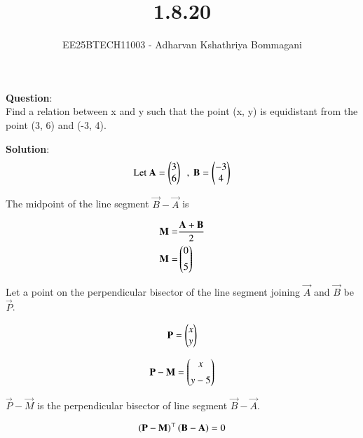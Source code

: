 \documentclass[journal]{IEEEtran}
\begin{document}

\vspace{3cm}

\title{1.8.20}
\author{EE25BTECH11003 - Adharvan Kshathriya Bommagani}
{\let\newpage\relax\maketitle}

\renewcommand{\thefigure}{\theenumi}
\renewcommand{\thetable}{\theenumi}
\setlength{\intextsep}{10pt} %
\textbf{Question}:\\
 Find a relation between x and y such that the point (x, y) is equidistant from the
point (3, 6) and (-3, 4).  
\bigskip

\textbf{Solution}:\\

\begin{align}
\text{Let } 
\mathbf{A} = \begin{pmatrix} 3 \\ 6 \end{pmatrix} \ \ ,\ \mathbf{B} = \begin{pmatrix} -3 \\ 4 \end{pmatrix}
\end{align}
 
The midpoint of the line segment $\vec{B}-\vec{A}$ is 

\begin{align}
    \mathbf{M} =& \frac{\mathbf{A}+\mathbf{B}}{2}\\
    \mathbf{M} =& \begin{pmatrix}0 \\[1ex] 5\end{pmatrix}
\end{align}

Let a point on the perpendicular bisector of the line segment joining $\vec{A}$ and $\vec{B}$ be $\vec{P}$. 

\begin{align}
    \mathbf{P} = \begin{pmatrix}x\\y\end{pmatrix}
\end{align}

\begin{align}
    \mathbf{P} - \mathbf{M} = \begin{pmatrix}x\\[1ex] y-5\end{pmatrix}
\end{align}

$\vec{P}-\vec{M}$ is the perpendicular bisector of line segment $\vec{B}-\vec{A}$.

\begin{align}
    \left(\mathbf{P}-\mathbf{M}\right)^\top\left(\mathbf{B}-\mathbf{A}\right) = 0
\end{align}
\end{document}

